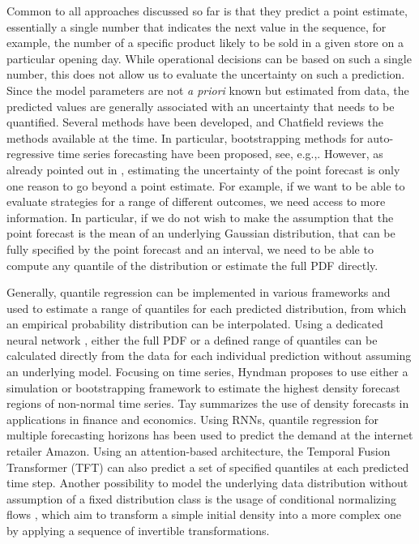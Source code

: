 \documentclass[BCOR=1mm, DIV=calc,10pt,
twoside=true,
twocolumn,
headings=normal]{scrartcl}
\begin{document}
Common to all approaches discussed so far is that they predict a point estimate, essentially a single number that indicates the next value in the sequence, for example, the number of a specific product likely to be sold in a given store on a particular opening day. While operational decisions can be based on such a single number, this does not allow us to evaluate the uncertainty on such a prediction. Since the model parameters are not {\em a priori} known but estimated from data, the predicted values are generally associated with an uncertainty that needs to be quantified. Several methods have been developed, and Chatfield \cite{chatfield1993calculating} reviews the methods available at the time. In particular, bootstrapping methods for auto-regressive time series forecasting have been proposed, see, e.g.,\cite{masarotto1990bootstrap,mccullough1994bootstrapping,mccullough1996consistent,grigoletto1998bootstrap,thombs1990bootstrap,clements2001bootstrapping,Angus1994,pascual2004bootstrap,pascual2001effects,pascual2005bootstrap}. However, as already pointed out in \cite{chatfield1993calculating}, estimating the uncertainty of the point forecast is only one reason to go beyond a point estimate. For example, if we want to be able to evaluate strategies for a range of different outcomes, we need access to more information. In particular, if we do not wish to make the assumption that the point forecast is the mean of an underlying Gaussian distribution, that can be fully specified by the point forecast and an interval, we need to be able to compute any quantile of the distribution or estimate the full PDF directly.

Generally, quantile regression \cite{koenker2001} can be implemented in various frameworks and used to estimate a range of quantiles for each predicted distribution, from which an empirical probability distribution can be interpolated. Using a dedicated neural network \cite{Feindt2006190}, either the full PDF or a defined range of quantiles can be calculated directly from the data for each individual prediction without assuming an underlying model. Focusing on time series, Hyndman \cite{hyndman1995highest} proposes to use either a simulation or bootstrapping framework to estimate the highest density forecast regions of non-normal time series. Tay \cite{tay2000density} summarizes the use of density forecasts in applications in finance and economics. Using RNNs, quantile regression for multiple forecasting horizons \cite{wen2017multi} has been used to predict the demand at the internet retailer Amazon. Using an attention-based architecture, the Temporal Fusion Transformer (TFT) \cite{lim2019temporal} can also predict a set of specified quantiles at each predicted time step. Another possibility to model the underlying data distribution without assumption of a fixed distribution class is the usage of conditional normalizing flows \cite{rezende2016variational,timeseriesflow}, which aim to transform a simple initial density into a more complex one by applying a sequence of invertible transformations.
\end{document}
